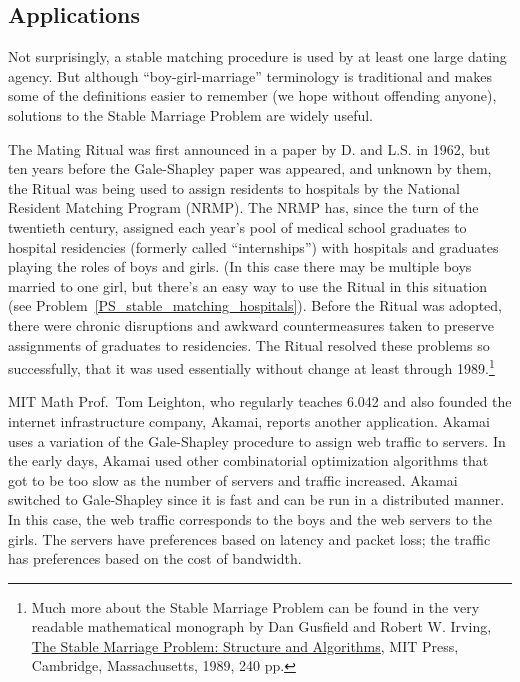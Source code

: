 \subsection{Applications}

Not surprisingly, a stable matching procedure is used by at least one
large dating agency.  But although ``boy-girl-marriage'' terminology is
traditional and makes some of the definitions easier to remember (we hope
without offending anyone), solutions to the Stable Marriage Problem are
widely useful.

The Mating Ritual was first announced in a paper by D.  and
L.S.  in 1962, but ten years before the Gale-Shapley paper was
appeared, and unknown by them, the Ritual was being used to assign
residents to hospitals by the National Resident Matching Program (NRMP).
The NRMP has, since the turn of the twentieth century, assigned each
year's pool of medical school graduates to hospital residencies (formerly
called ``internships'') with hospitals and graduates playing the roles of
boys and girls.  (In this case there may be multiple boys married to one
girl, but there's an easy way to use the Ritual in this situation (see
Problem~\ref{PS_stable_matching_hospitals}).  Before the Ritual was
adopted, there were chronic disruptions and awkward countermeasures taken
to preserve assignments of graduates to residencies.  The Ritual resolved
these problems so successfully, that it was used essentially without
change at least through 1989.\footnote{Much more about the Stable Marriage
  Problem can be found in the very readable mathematical monograph by Dan
  Gusfield and Robert W. Irving,
  \href{http://mitpress.mit.edu/catalog/item/default.asp?ttype=2&tid=7676}{The
    Stable Marriage Problem: Structure and Algorithms}, MIT Press,
  Cambridge, Massachusetts, 1989, 240 pp.}

MIT Math Prof.\ Tom Leighton, who regularly teaches 6.042 and also founded
the internet infrastructure company, Akamai, reports another application.
Akamai uses a variation of the Gale-Shapley procedure to assign web
traffic to servers.  In the early days, Akamai used other combinatorial
optimization algorithms that got to be too slow as the number of servers
and traffic increased.  Akamai switched to Gale-Shapley since it is fast
and can be run in a distributed manner.  In this case, the web traffic
corresponds to the boys and the web servers to the girls.  The servers
have preferences based on latency and packet loss; the traffic has
preferences based on the cost of bandwidth.

